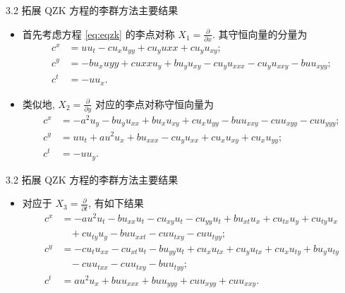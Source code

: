 \documentclass{beamer}
\begin{document}
\begin{frame}{3.2 拓展 QZK 方程的李群方法主要结果}
\begin{itemize}
 \item[(1)] 首先考虑方程 \eqref{eq:eqzk} 的李点对称 $X_{1}=\frac{\partial}{\partial x}$. 其守恒向量的分量为
\begin{equation*}
\begin{aligned}
c^{x}&=uu_t-cu_xu_{yy}+cu_yu{xx}+cu_yu_{xy};\\
c^{y}&=-bu_xu{yy}+cu{xx}u_y+bu_yu_{xy}-cu_yu_{xxx}-cu_yu_{xxy}-buu_{xyy};\\
c^{t}&=-uu_x.
\end{aligned}
\end{equation*}
 \item[(2)] 类似地, $X_{2}=\frac{\partial}{\partial y}$ 对应的李点对称守恒向量为
\begin{equation*}
\begin{aligned}
c^{x}&=-a^2u_y-bu_yu_{xx}+bu_xu_{xy}+cu_xu_{yy}-buu_{xxy}-cuu_{xyy}-cuu_{yyy};\\
c^{y}&=uu_t+au^2u_x+bu_{xxx}-cu_yu_{xx}+cu_xu_{xy}+cu_xu_{yy};\\
c^{t}&=-uu_y.
\end{aligned}
\end{equation*}
\end{itemize}
\end{frame}

\begin{frame}{3.2 拓展 QZK 方程的李群方法主要结果}
\begin{itemize}
\item[(3)] 对应于 $X_{3}=\frac{\partial}{\partial t}$, 有如下结果
\begin{equation*}
\begin{aligned}
c^{x}&=-au^2u_t-bu_{xx}u_t-cu_{xy}u_t-cu_{yy}u_t+bu_{xt}u_x+cu_{tx}u_y+cu_{ty}u_x\\
&~~~~+cu_{ty}u_y-buu_{xxt}-cuu_{txy}-cuu_{tyy};\\
c^{y}&=-cu_tu_{xx}-cu_{xt}u_t-bu_{yy}u_t+cu_xu_{tx}+cu_yu_{tx}+cu_xu_{ty}+bu_yu_{ty}\\
&~~~~-cuu_{txx}-cuu_{txy}-buu_{tyy};\\
c^{t}&=au^2u_x+buu_{xxx}+buu_{yyy}+cuu_{xyy}+cuu_{xxy}.
\end{aligned}
\end{equation*}
\end{itemize}
\end{frame}
\end{document}

